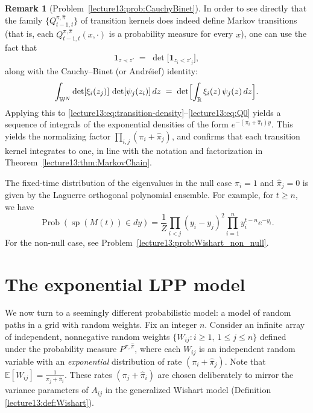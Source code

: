 \documentclass[letterpaper,11pt,oneside,reqno]{book}
\numberwithin{equation}{chapter}  %
\theoremstyle{definition}
\newtheorem{remark}[proposition]{Remark}
\begin{document}
\begin{remark}[Problem~\ref{lecture13:prob:CauchyBinet}]
\label{lecture13:rem:CauchyBinet}
In order to see directly that the family $\bigl\{Q^{\pi,\hat{\pi}}_{t-1,t}\bigr\}$ of transition kernels does indeed define Markov transitions (that is, each $Q^{\pi,\hat{\pi}}_{t-1,t}(x,\cdot)$ is a probability measure for every $x$), one can use the fact that
\[
	\mathbf{1}_{z \prec z'}
\;=\;
\det\bigl[\mathbf{1}_{z_i < z'_j}\bigr],
\]
along with the Cauchy--Binet (or Andr\'eief) identity:
\[
\int_{\mathbb{W}^N}
\det[\xi_i(z_j)]\,
\det[\psi_j(z_i)]
\,dz
\;=\;
\det\Bigl[
\int_{\mathbb{R}}
\xi_i(z)\,\psi_j(z)\,dz
\Bigr].
\]
Applying this to
\eqref{lecture13:eq:transition-density}--\eqref{lecture13:eq:Q0}
yields a sequence of integrals
of the exponential densities
of the form $e^{-(\pi_i+\hat \pi_t)y}$.
This yields the normalizing factor
$\prod_{i,j}(\pi_i+\hat \pi_j)$,
and confirms
that each transition kernel
integrates to one, in line with the notation and
factorization in Theorem~\ref{lecture13:thm:MarkovChain}.
\end{remark}

The fixed-time distribution of the eigenvalues
in the null case $\pi_i=1$ and $\hat\pi_j=0$ is
given by the Laguerre orthogonal polynomial ensemble. For example, for $t\ge n$, we have
\begin{equation}
	\label{lecture13:eq:Laguerre}
	\operatorname{Prob}(\operatorname{sp}(M(t))\in dy)
	=
	\frac{1}{Z}\prod_{i<j}(y_i-y_j)^2
	\prod_{i=1}^n y_i^{t-n} e^{-y_i}.
\end{equation}
For the non-null case, see Problem~\ref{lecture13:prob:Wishart_non_null}.

\section{The exponential LPP model}

We now turn to a seemingly different probabilistic model: a
model of random paths in a grid with random weights. Fix an
integer $n$. Consider an infinite array of independent,
nonnegative random weights $\{W_{ij}: i\ge 1,\ 1\le j\le n\}$ defined under the probability measure $P^{\pi,\hat\pi}$,
where each $W_{ij}$ is an independent random variable with
an \emph{exponential} distribution of rate $(\pi_i +
\hat\pi_j)$.
Note that $\mathbb{E}[W_{ij}] = \frac{1}{\pi_j+\hat\pi_i}$.
These rates $(\pi_j+\hat\pi_i)$ are chosen deliberately to
mirror the variance parameters of $A_{ij}$ in the
generalized Wishart model (Definition \ref{lecture13:def:Wishart}).
\end{document}
